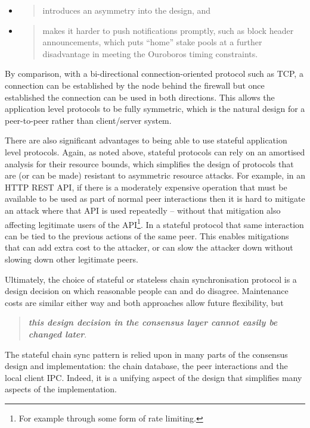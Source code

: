 \documentclass[]{article}
\begin{document}
\begin{itemize}
\item
  \begin{quote}
  introduces an asymmetry into the design, and
  \end{quote}
\item
  \begin{quote}
  makes it harder to push notifications promptly, such as block header
  announcements, which puts ``home'' stake pools at a further
  disadvantage in meeting the Ouroboros timing constraints.
  \end{quote}
\end{itemize}

By comparison, with a bi-directional connection-oriented protocol such
as TCP, a connection can be established by the node behind the firewall
but once established the connection can be used in both directions. This
allows the application level protocols to be fully symmetric, which is
the natural design for a peer-to-peer rather than client/server system.

There are also significant advantages to being able to use stateful
application level protocols. Again, as noted above, stateful protocols
can rely on an amortised analysis for their resource bounds, which
simplifies the design of protocols that are (or can be made) resistant
to asymmetric resource attacks. For example, in an HTTP REST API, if
there is a moderately expensive operation that must be available to be
used as part of normal peer interactions then it is hard to mitigate an
attack where that API is used repeatedly -- without that mitigation also
affecting legitimate users of the API\footnote{For example through some
  form of rate limiting.}. In a stateful protocol that same interaction
can be tied to the previous actions of the same peer. This enables
mitigations that can add extra cost to the attacker, or can slow the
attacker down without slowing down other legitimate peers.

Ultimately, the choice of stateful or stateless chain synchronisation
protocol is a design decision on which reasonable people can and do
disagree. Maintenance costs are similar either way and both approaches
allow future flexibility, but

\begin{quote}
\emph{\textbf{this design decision in the consensus layer cannot easily
be changed later}}.
\end{quote}

The stateful chain sync pattern is relied upon in many parts of the
consensus design and implementation: the chain database, the peer
interactions and the local client IPC. Indeed, it is a unifying aspect
of the design that simplifies many aspects of the implementation.
\end{document}
